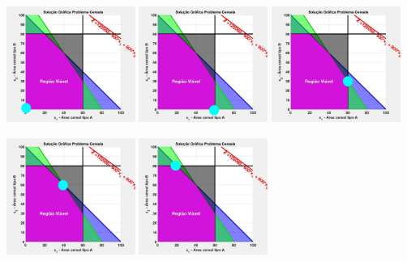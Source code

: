 \documentclass{beamer}
\begin{document}
\begin{frame}
{\begin{columns}
\begin{column}{0.3\textwidth}
			\end{column}
		\end{columns}
	}
	{
		\centering
		\includegraphics[width=4.2cm,height=4.2cm]{Exaustiva_2.jpeg}
	}
	\only<4>
	{
		\centering
		\includegraphics[width=4.2cm,height=4.2cm]{Exaustiva_3.jpeg}
	}
	\only<5>
	{
		\centering
		\includegraphics[width=4.2cm,height=4.2cm]{Exaustiva_4.jpeg}
	}
	\only<6>
	{
		\centering
		\includegraphics[width=4.2cm,height=4.2cm]{Exaustiva_5.jpeg}
	}
	\only<7>
	{
		\centering
		\includegraphics[width=4.2cm,height=4.2cm]{Exaustiva_6.jpeg}
}
\end{frame}
\end{document}
